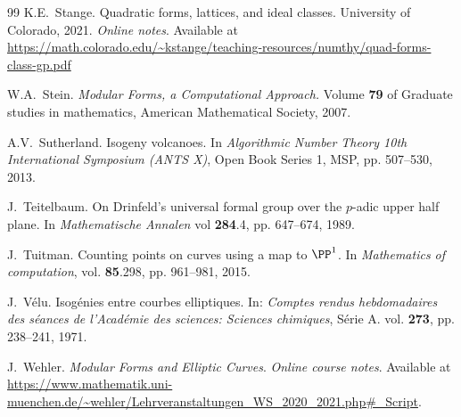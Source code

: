 \documentclass[10pt]{amsart}
\theoremstyle{theostyle}
\begin{document}
\begin{thebibliography}{99}
K.E.~Stange. 
Quadratic forms, lattices, and ideal classes. 
University of Colorado, 2021. {\it Online notes}. Available at \url{https://math.colorado.edu/~kstange/teaching-resources/numthy/quad-forms-class-gp.pdf}

W.A.~Stein.
{\it Modular Forms, a Computational Approach.}
Volume {\bf 79} of Graduate studies in mathematics, American Mathematical Society, 2007.

A.V.~Sutherland.
Isogeny volcanoes.
In {\it Algorithmic Number Theory 10th International Symposium (ANTS X)}, Open Book Series 1, MSP, pp. 507--530, 2013.

J.~Teitelbaum. 
On Drinfeld's universal formal group over the $p$-adic upper half plane.
In {\it Mathematische Annalen} vol {\bf 284}.4, pp. 647--674, 1989.

J.~Tuitman.
Counting points on curves using a map to $\PP^1$. 
In {\it Mathematics of computation}, vol. {\bf 85}.298, pp. 961--981, 2015.

J.~Vélu.
Isogénies entre courbes elliptiques. 
In: {\it Comptes rendus hebdomadaires des s\'eances de l’Acad\'emie des sciences: Sciences chimiques}, S\'erie A. vol. {\bf 273}, pp. 238–241, 1971.

J.~Wehler. 
{\it Modular Forms and Elliptic Curves}.
{\it Online course notes}. Available at \url{https://www.mathematik.uni-muenchen.de/~wehler/Lehrveranstaltungen_WS_2020_2021.php#_Script}.

\end{thebibliography}
\end{document}
